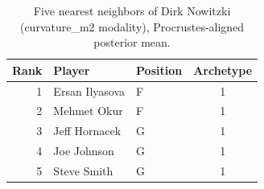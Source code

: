 \begin{table}[htbp]
  \centering\small
  \begin{tabular}{rllc}
    \toprule
    Rank & Player & Position & Archetype \\
    \midrule
    1 & Ersan Ilyasova & F & 1 \\
    2 & Mehmet Okur & F & 1 \\
    3 & Jeff Hornacek & G & 1 \\
    4 & Joe Johnson & G & 1 \\
    5 & Steve Smith & G & 1 \\
    \bottomrule
  \end{tabular}
  \caption{Five nearest neighbors of Dirk Nowitzki (curvature_m2 modality), Procrustes-aligned posterior mean.}
  \label{tab:Dirk_Nowitzki_neighbors_curvature_m2}
\end{table}

